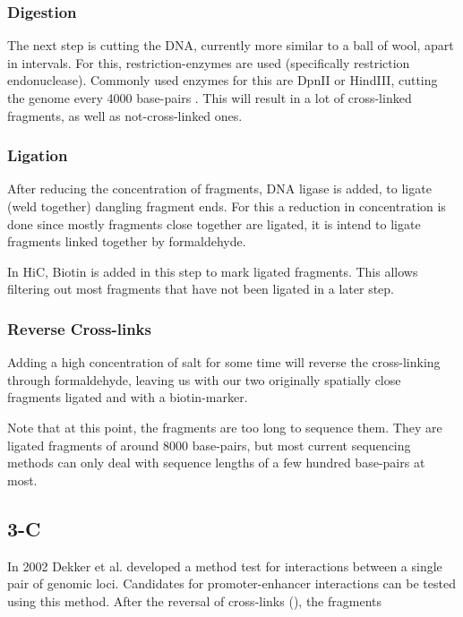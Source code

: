 \subsubsection{Digestion}\label{sec:digestion}

The next step is cutting the DNA, currently more similar to a ball of wool,
apart in intervals. For this, restriction-enzymes are used (specifically
restriction endonuclease). Commonly used enzymes for this are DpnII or HindIII,
cutting the genome every 4000 base-pairs \cite{liebermann2009comprehensive}.
This will result in a lot of cross-linked fragments, as well as
not-cross-linked ones.

\subsubsection{Ligation}\label{sec:ligation}

After reducing the concentration of fragments, DNA ligase is added, to ligate
(weld together) dangling fragment ends. For this a reduction in concentration
is done since mostly fragments close together are ligated, it is intend to
ligate fragments linked together by formaldehyde.

In HiC, Biotin is added in this step to mark ligated fragments. This allows
filtering out most fragments that have not been ligated in a later step.


\subsubsection{Reverse Cross-links}\label{sec:revcrosslink}

Adding a high concentration of salt for some time will reverse the
cross-linking through formaldehyde, leaving us with our two originally
spatially close fragments ligated and with a biotin-marker.


Note that at this point, the fragments are too long to sequence them.
They are ligated fragments of around 8000 base-pairs, but most current
sequencing methods can only deal with sequence lengths of a few hundred
base-pairs at most.




\subsection{3-C}\label{sec:3C} 

In 2002 Dekker et al. \cite{dekker2002capturing} developed a method test for interactions
between a single pair of genomic loci. Candidates for promoter-enhancer
interactions can be tested using this method.
After the reversal of cross-links (), the fragments



